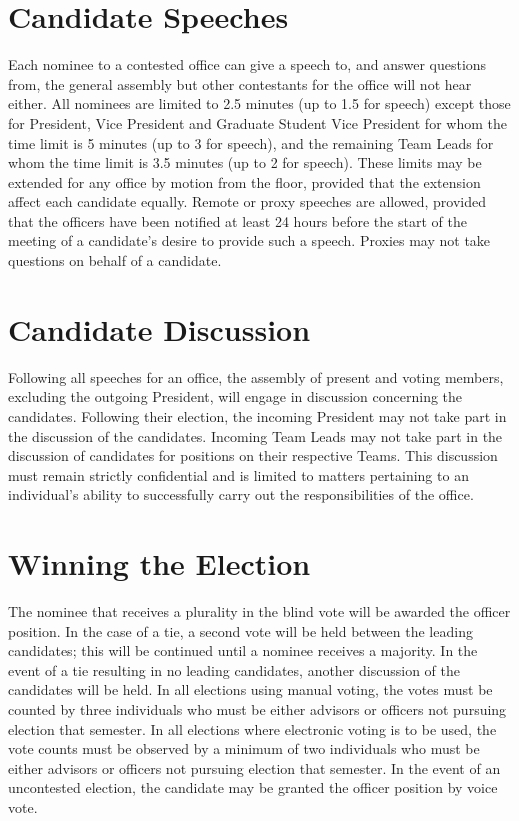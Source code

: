 \section{Candidate Speeches} Each nominee to a contested office can give a speech to, and answer questions from, the general assembly but other contestants for the office will not hear either. All nominees are limited to 2.5 minutes (up to 1.5 for speech) except those for President,  Vice President and Graduate Student Vice President for whom the time limit is 5 minutes (up to 3 for speech), and the remaining Team Leads for whom the time limit is 3.5 minutes (up to 2 for speech). These limits may be extended for any office by motion from the floor, provided that the extension affect each candidate equally. Remote or proxy speeches are allowed, provided that the officers have been notified at least 24 hours before the start of the meeting of a candidate's desire to provide such a speech. Proxies may not take questions on behalf of a candidate.
\section{Candidate Discussion} Following all speeches for an office, the assembly of present and voting members, excluding the outgoing President, will engage in discussion concerning the candidates.  Following their election, the incoming President may not take part in the discussion of the candidates. Incoming Team Leads may not take part in the discussion of candidates for positions on their respective Teams. This discussion must remain strictly confidential and is limited to matters pertaining to an individual's ability to successfully carry out the responsibilities of the office. 
\section{Winning the Election} The nominee that receives a plurality in the blind vote will be awarded the officer position.  In the case of a tie, a second vote will be held between the leading candidates; this will be continued until a nominee receives a majority.  In the event of a tie resulting in no leading candidates, another discussion of the candidates will be held. In all elections using manual voting, the votes must be counted by three individuals who must be either advisors or officers not pursuing election that semester. In all elections where electronic voting is to be used, the vote counts must be observed by a minimum of two individuals who must be either advisors or officers not pursuing election that semester.  In the event of an uncontested election, the candidate may be granted the officer position by voice vote. 

